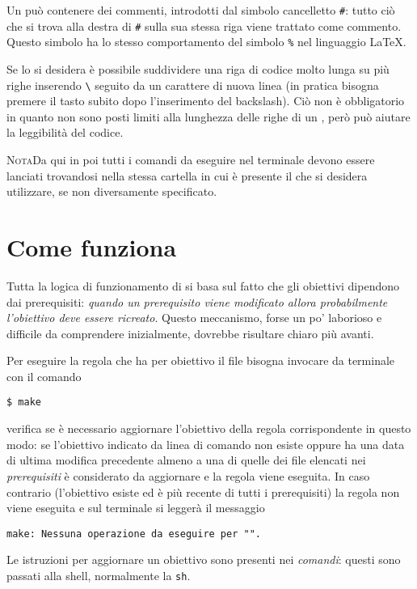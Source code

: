 Un  può contenere dei commenti, introdotti dal simbolo
cancelletto \texttt{\#}: tutto ciò che si trova alla destra di \texttt{\#} sulla
sua stessa riga viene trattato come commento.  Questo simbolo ha lo stesso
comportamento del simbolo \texttt{\%} nel linguaggio \LaTeX{}.

Se lo si desidera è possibile suddividere una riga di codice molto lunga su più
righe inserendo \texttt{\textbackslash{}} seguito da un carattere di nuova linea
(in pratica bisogna premere il tasto  subito dopo l'inserimento del
backslash).  Ciò non è obbligatorio in quanto non sono posti limiti alla
lunghezza delle righe di un , però può aiutare la
leggibilità del codice.

\textsc{Nota}\quad Da qui in poi tutti i comandi da eseguire nel terminale
devono essere lanciati trovandosi nella stessa cartella in cui è presente il
 che si desidera utilizzare, se non diversamente
specificato.

\section{Come funziona }
\label{sec:come-funziona}

Tutta la logica di funzionamento di  si basa sul fatto che gli
obiettivi dipendono dai prerequisiti:
\emph{quando un prerequisito viene modificato allora probabilmente l'obiettivo
  deve essere ricreato}.
Questo meccanismo, forse un po' laborioso e difficile da comprendere
inizialmente, dovrebbe risultare chiaro più avanti.

Per eseguire la regola che ha per obiettivo il file  bisogna
invocare  da terminale con il comando
\begin{sintassi}
  \small \texttt{\$ make} 
\end{sintassi}
 verifica se è necessario aggiornare l'obiettivo della regola
corrispondente in questo modo: se l'obiettivo indicato da linea di comando non
esiste oppure ha una data di ultima modifica precedente almeno a una di quelle
dei file elencati nei \emph{prerequisiti} è considerato da aggiornare e la
regola viene eseguita.  In caso contrario (l'obiettivo esiste ed è più recente
di tutti i prerequisiti) la regola non viene eseguita e sul terminale si leggerà
il messaggio
\begin{flushleft}
  \texttt{make: Nessuna operazione da eseguire per "}\texttt{".}
\end{flushleft}
Le istruzioni per aggiornare un obiettivo sono presenti nei \emph{comandi}:
questi sono passati alla shell, normalmente la \texttt{sh}.

